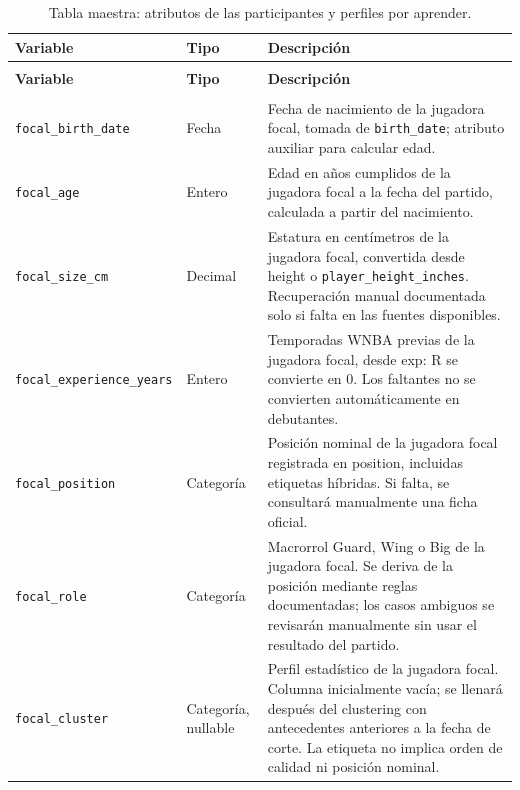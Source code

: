 \begingroup
\small
{}
\setlength{\tabcolsep}{4pt}
\renewcommand{\arraystretch}{1.15}
\begin{longtable}{@{}>{\raggedright\arraybackslash}p{5.0cm}>{\raggedright\arraybackslash}p{1.9cm}>{\raggedright\arraybackslash}p{7.7cm}@{}}
\caption{Tabla maestra: atributos de las participantes y perfiles por aprender.}\label{tab:maestra_atributos}\\
\toprule\textbf{Variable}&\textbf{Tipo}&\textbf{Descripción}\\\midrule\endfirsthead
\multicolumn{3}{l}{\small Continuación de la Tabla~\ref{tab:maestra_atributos}}\\
\toprule\textbf{Variable}&\textbf{Tipo}&\textbf{Descripción}\\\midrule\endhead
\midrule\multicolumn{3}{r}{\small Continúa en la siguiente página}\\\endfoot
\bottomrule\endlastfoot
\texttt{focal\_\allowbreak birth\_\allowbreak date} & Fecha & Fecha de nacimiento de la jugadora focal, tomada de \texttt{birth\_\allowbreak date}; atributo auxiliar para calcular edad.\\
\texttt{focal\_\allowbreak age} & Entero & Edad en años cumplidos de la jugadora focal a la fecha del partido, calculada a partir del nacimiento.\\
\texttt{focal\_\allowbreak size\_\allowbreak cm} & Decimal & Estatura en centímetros de la jugadora focal, convertida desde height o \texttt{player\_\allowbreak height\_\allowbreak inches}. Recuperación manual documentada solo si falta en las fuentes disponibles.\\
\texttt{focal\_\allowbreak experience\_\allowbreak years} & Entero & Temporadas WNBA previas de la jugadora focal, desde exp: R se convierte en 0. Los faltantes no se convierten automáticamente en debutantes.\\
\texttt{focal\_\allowbreak position} & Categoría & Posición nominal de la jugadora focal registrada en position, incluidas etiquetas híbridas. Si falta, se consultará manualmente una ficha oficial.\\
\texttt{focal\_\allowbreak role} & Categoría & Macrorrol Guard, Wing o Big de la jugadora focal. Se deriva de la posición mediante reglas documentadas; los casos ambiguos se revisarán manualmente sin usar el resultado del partido.\\
\texttt{focal\_\allowbreak cluster} & Categoría, nullable & Perfil estadístico de la jugadora focal. Columna inicialmente vacía; se llenará después del clustering con antecedentes anteriores a la fecha de corte. La etiqueta no implica orden de calidad ni posición nominal.\\

\end{longtable}
